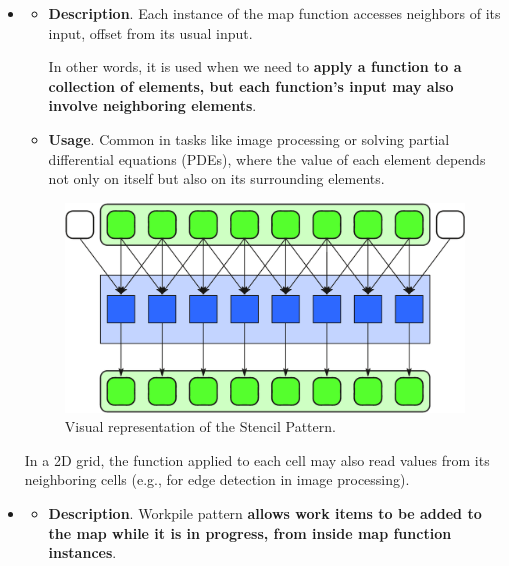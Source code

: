 \begin{itemize}
    \item {}
    \begin{itemize}
        \item[\textcolor{Red2}{\faIcon{book}}] \textcolor{Red2}{\textbf{Description}}. Each instance of the map function accesses neighbors of its input, offset from its usual input.

        In other words, it is used when we need to \textbf{apply a function to a collection of elements, but each function's input may also involve neighboring elements}.

        \item[\textcolor{Green3}{\faIcon{question}}] \textcolor{Green3}{\textbf{Usage}}. Common in tasks like image processing or solving partial differential equations (PDEs), where the value of each element depends not only on itself but also on its surrounding elements.
    \end{itemize}
    \begin{figure}[!htp]
        \centering
        \includegraphics[width=.8\textwidth]{img/stencil-pattern-2.pdf}
        \caption{Visual representation of the Stencil Pattern.}
    \end{figure}
    \begin{examplebox}
        In a 2D grid, the function applied to each cell may also read values from its neighboring cells (e.g., for edge detection in image processing).
    \end{examplebox}


    \item {}
    \begin{itemize}
        \item[\textcolor{Red2}{\faIcon{book}}] \textcolor{Red2}{\textbf{Description}}. Workpile pattern \textbf{allows work items to be added to the map while it is in progress, from inside map function instances}.


\end{itemize}
\end{itemize}
